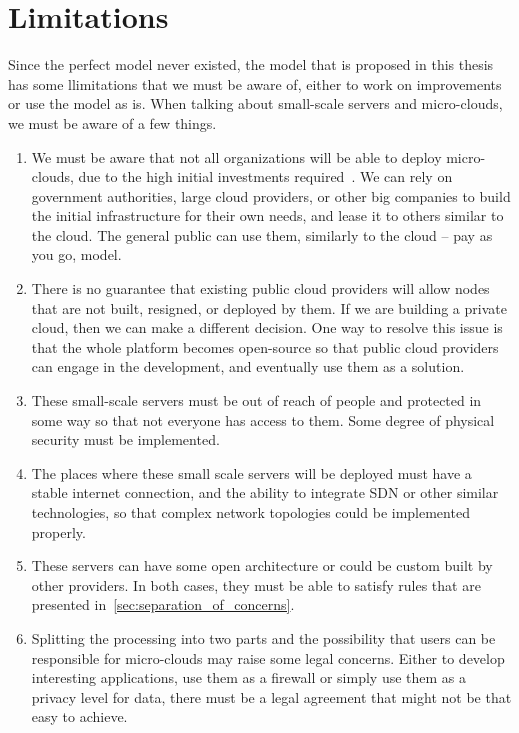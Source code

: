\section{Limitations}\label{sec:limitations}
%
Since the perfect model never existed, the model that is proposed in this thesis has some llimitations that we must be aware of, either to work on improvements or use the model as is. When talking about small-scale servers and micro-clouds, we must be aware of a few things.

\begin{enumerate}[start=1,label={(\bfseries \arabic*)}]
	\item We must be aware that not all organizations will be able to deploy micro-clouds, due to the high initial investments required~\cite{MonsalveCC18}. We can rely on government authorities, large cloud providers, or other big companies to build the initial infrastructure for their own needs, and lease it to others similar to the cloud. The general public can use them, similarly to the cloud -- pay as you go, model.
	\item There is no guarantee that existing public cloud providers will allow nodes that are not built, resigned, or deployed by them. If we are building a private cloud, then  we can make a different decision. One way to resolve this issue is that the whole platform becomes open-source so that public cloud providers can engage in the development, and eventually use them as a solution.
	\item These small-scale servers must be out of reach of people and protected in some way so that not everyone has access to them. Some degree of physical security must be implemented.
	\item The places where these small scale servers will be deployed must have a stable internet connection, and the ability to integrate SDN or other similar technologies, so that complex network topologies could be implemented properly.
	\item These servers can have some open architecture or could be custom built by other providers. In both cases, they must be able to satisfy rules that are presented in~\ref{sec:separation_of_concerns}.
	\item Splitting the processing into two parts and the possibility that users can be responsible for micro-clouds may raise some legal concerns. Either to develop interesting applications, use them as a firewall or simply use them as a privacy level for data, there must be a legal agreement that might not be that easy to achieve.
\end{enumerate}
%
%
